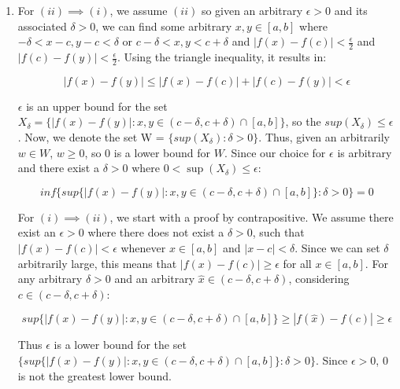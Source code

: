 \documentclass{article}
\begin{document}
\begin{enumerate}[leftmargin=*, label=\arabic*.]
  \item 
  For $(ii) \implies (i)$, we assume $(ii)$ so given an arbitrary $\epsilon > 0$ and its associated $\delta > 0$, we can find some arbitrary $x, y \in [a, b]$ where $-\delta < x - c, y - c < \delta$ or $ c - \delta < x, y < c + \delta$ and $|f(x) - f(c)| < \frac{\epsilon}{2}$ and $|f(c) - f(y)| < \frac{\epsilon}{2}$. Using the triangle inequality, it results in: 

  $$|f(x) - f(y)| \leq |f(x) - f(c)| + |f(c) - f(y)| < \epsilon$$

  $\epsilon$ is an upper bound for the set $X_\delta = \{|f(x) - f(y)|: x, y \in (c - \delta, c + \delta)\cap[a, b]\}$, so the $sup(X_\delta) \leq \epsilon$. Now, we denote the set W = $\{sup(X_\delta): \delta > 0\}$. Thus, given an arbitrarily $w \in W$, $w \geq 0$, so 0 is a lower bound for $W$. Since our choice for $\epsilon$ is arbitrary and there exist a $\delta > 0$ where $0 < \sup(X_\delta) \leq \epsilon$:
  
  $$inf\{sup\{|f(x) - f(y)|: x, y \in (c - \delta, c + \delta) \cap [a, b]\}: \delta > 0\} = 0$$

  For $(i) \implies (ii)$, we start with a proof by contrapositive. We assume there exist an $\epsilon > 0$ where there does not exist a $\delta > 0$, such that $|f(x) - f(c)| < \epsilon$ whenever $x \in [a, b]$ and $|x - c| < \delta$. Since we can set $\delta$ arbitrarily large, this means that $|f(x) - f(c)| \geq \epsilon$ for all $x \in [a, b]$. For any arbitrary $\delta > 0$ and an arbitrary $\hat{x} \in (c - \delta, c + \delta)$, considering $c \in (c - \delta, c + \delta)$: 
  
  $$sup\{|f(x)-f(y)|: x, y \in (c-\delta, c+\delta)\cap[a,b]\} \geq |f(\hat{x}) - f(c)| \geq \epsilon$$

  Thus $\epsilon$ is a lower bound for the set  $\{sup\{|f(x) - f(y)|: x, y \in (c - \delta, c + \delta) \cap [a, b]\}: \delta > 0\}$. Since $\epsilon > 0$, 0 is not the greatest lower bound. 
  

\end{enumerate}
\end{document}
